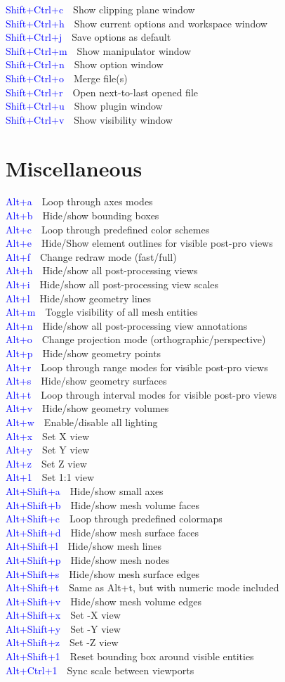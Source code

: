 \documentclass[10pt, twocolumn]{article}
\newcommand{\command}[2]{\textcolor{blue}{#1}~\dotfill{}~#2\\} %
\begin{document}
\command{Shift+Ctrl+c}{Show clipping plane window}
\command{Shift+Ctrl+h}{Show current options and workspace window}
\command{Shift+Ctrl+j}{Save options as default}
\command{Shift+Ctrl+m}{Show manipulator window}
\command{Shift+Ctrl+n}{Show option window}
\command{Shift+Ctrl+o}{Merge file(s)}
\command{Shift+Ctrl+r}{Open next-to-last opened file}
\command{Shift+Ctrl+u}{Show plugin window}
\command{Shift+Ctrl+v}{Show visibility window}

\section*{Miscellaneous}

\command{Alt+a}{Loop through axes modes}
\command{Alt+b}{Hide/show bounding boxes}
\command{Alt+c}{Loop through predefined color schemes}
\command{Alt+e}{Hide/Show element outlines for visible post-pro views}
\command{Alt+f}{Change redraw mode (fast/full)}
\command{Alt+h}{Hide/show all post-processing views}
\command{Alt+i}{Hide/show all post-processing view scales}
\command{Alt+l}{Hide/show geometry lines}
\command{Alt+m}{Toggle visibility of all mesh entities}
\command{Alt+n}{Hide/show all post-processing view annotations}
\command{Alt+o}{Change projection mode (orthographic/perspective)}
\command{Alt+p}{Hide/show geometry points}
\command{Alt+r}{Loop through range modes for visible post-pro views}
\command{Alt+s}{Hide/show geometry surfaces}
\command{Alt+t}{Loop through interval modes for visible post-pro views}
\command{Alt+v}{Hide/show geometry volumes}
\command{Alt+w}{Enable/disable all lighting}
\command{Alt+x}{Set X view}
\command{Alt+y}{Set Y view}
\command{Alt+z}{Set Z view}
\command{Alt+1}{Set 1:1 view}
\command{Alt+Shift+a}{Hide/show small axes}
\command{Alt+Shift+b}{Hide/show mesh volume faces}
\command{Alt+Shift+c}{Loop through predefined colormaps}
\command{Alt+Shift+d}{Hide/show mesh surface faces}
\command{Alt+Shift+l}{Hide/show mesh lines}
\command{Alt+Shift+p}{Hide/show mesh nodes}
\command{Alt+Shift+s}{Hide/show mesh surface edges}
\command{Alt+Shift+t}{Same as Alt+t, but with numeric mode included}
\command{Alt+Shift+v}{Hide/show mesh volume edges}
\command{Alt+Shift+x}{Set -X view}
\command{Alt+Shift+y}{Set -Y view}
\command{Alt+Shift+z}{Set -Z view}
\command{Alt+Shift+1}{Reset bounding box around visible entities}
\command{Alt+Ctrl+1}{Sync scale between viewports}
\end{document}
